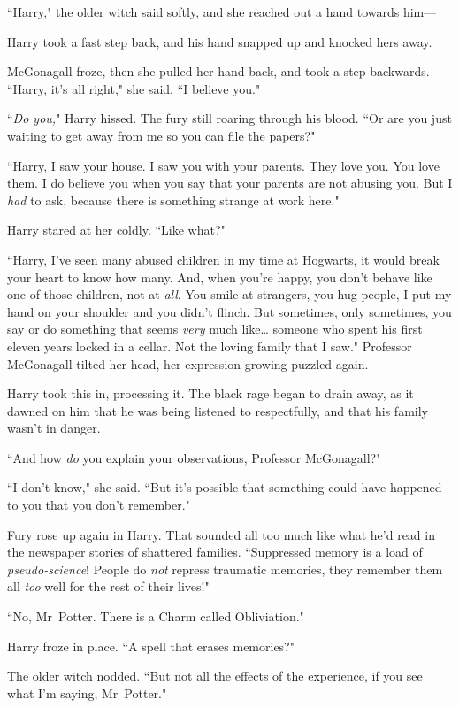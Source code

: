 ``Harry," the older witch said softly, and she reached out a hand towards him—

Harry took a fast step back, and his hand snapped up and knocked hers away.

McGonagall froze, then she pulled her hand back, and took a step backwards. ``Harry, it's all right," she said. ``I believe you."

``\emph{Do you,}" Harry hissed. The fury still roaring through his blood. ``Or are you just waiting to get away from me so you can file the papers?"

``Harry, I saw your house. I saw you with your parents. They love you. You love them. I do believe you when you say that your parents are not abusing you. But I \emph{had} to ask, because there is something strange at work here."

Harry stared at her coldly. ``Like what?"

``Harry, I've seen many abused children in my time at Hogwarts, it would break your heart to know how many. And, when you're happy, you don't behave like one of those children, not at \emph{all}. You smile at strangers, you hug people, I put my hand on your shoulder and you didn't flinch. But sometimes, only sometimes, you say or do something that seems \emph{very} much like{\ldots} someone who spent his first eleven years locked in a cellar. Not the loving family that I saw." Professor McGonagall tilted her head, her expression growing puzzled again.

Harry took this in, processing it. The black rage began to drain away, as it dawned on him that he was being listened to respectfully, and that his family wasn't in danger.

``And how \emph{do} you explain your observations, Professor McGonagall?"

``I don't know," she said. ``But it's possible that something could have happened to you that you don't remember."

Fury rose up again in Harry. That sounded all too much like what he'd read in the newspaper stories of shattered families. ``Suppressed memory is a load of \emph{pseudo-science}! People do \emph{not} repress traumatic memories, they remember them all \emph{too} well for the rest of their lives!"

``No, Mr~Potter. There is a Charm called Obliviation."

Harry froze in place. ``A spell that erases memories?"

The older witch nodded. ``But not all the effects of the experience, if you see what I'm saying, Mr~Potter."

